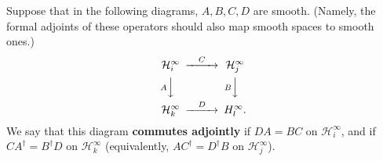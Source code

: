 \documentclass[11pt,b5paper,notitlepage]{article}
\theoremstyle{definition}
\theoremstyle{plain}
\newcommand{\mc}{\mathcal}
\numberwithin{equation}{subsection}
\begin{document}
Suppose that in the following diagrams, $A,B,C,D$ are smooth. (Namely, the formal adjoints of these operators should also map smooth spaces to smooth ones.) 
\begin{align}
\begin{CD}
\mc H_i^\infty @>C>> \mc H_j^\infty\\
@V A VV @V B VV\\
\mc H_k^\infty @>D>> \mc \mc H_l^\infty.
\end{CD}
\end{align}
We say that this diagram \textbf{commutes adjointly} if $DA=BC$ on $\mc H_i^\infty$, and if $CA^\dagger=B^\dagger D$ on $\mc H_k^\infty$ (equivalently, $AC^\dagger=D^\dagger B$ on $\mc H_j^\infty$).
\end{document}
